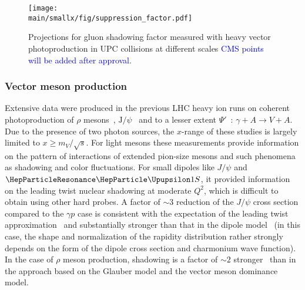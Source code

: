 \documentclass[../report.tex]{subfiles}
\providecommand{\main}{..}
\begin{document}
\begin{figure}
\centering
\texttt{[image: \\main/smallx/fig/suppression\_factor.pdf]}
\caption{Projections for gluon shadowing factor measured with heavy vector photoproduction in \PbPb UPC collisions at different scales \textcolor{blue}{CMS points will be added after approval}.}
\label{fig:r}
\end{figure}



\subsubsection{Vector meson production}


Extensive data were produced in the previous LHC heavy ion runs on coherent photoproduction  of $\rho$ mesons~\cite{Adam:2015gsa}, 
$\mathrm{J/}\psi$~\cite{Abbas:2013oua,Abelev:2012ba,Khachatryan:2016qhq} and to a lesser extent $\Psi'$~\cite{Adam:2015sia}: 
$\gamma+ A \to V +A$. Due to the presence of two photon sources, the $x$-range of these studies is largely  limited
to $x\ge m_V/\sqrt{s}$. For light mesons these measurements provide information on the pattern of interactions of extended pion-size mesons and such phenomena as shadowing and color fluctuations. For small dipoles like $J/\psi$ and $\PGUP{1S}$, 
it provided information on the leading twist nuclear shadowing at moderate $Q^2$, which is difficult to obtain using other hard probes. A factor of $\sim 3$ reduction of the $J/\psi$ 
cross section compared to the $\gamma p$ case is consistent with the expectation of the leading twist 
approximation~\cite{Guzey:2013xba,Guzey:2013qza} and substantially stronger than that in the dipole 
model~\cite{Lappi:2013am} (in this case, the shape and normalization of the rapidity distribution rather 
strongly depends on the form of the dipole cross section and charmonium wave function).
In the case of $\rho$ meson production, shadowing is a factor of $\sim 2$ stronger~\cite{Frankfurt:2015cwa} than in the approach based on
the Glauber model and the vector meson dominance model.
\end{document}
